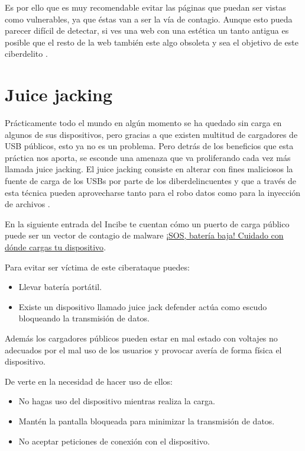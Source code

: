 \documentclass[
  a4paper,
  openany]{book}
\begin{document}
Es por ello que es muy recomendable evitar las páginas que puedan ser vistas como vulnerables, ya que éstas van a ser la vía de contagio. Aunque esto pueda parecer difícil de detectar, si ves una web con una estética un tanto antigua es posible que el resto de la web también este algo obsoleta y sea el objetivo de este ciberdelito \citep{RZ-formjacking}.

\hypertarget{juice-jacking}{%
\section{Juice jacking}\label{juice-jacking}}

Prácticamente todo el mundo en algún momento se ha quedado sin carga en algunos de sus dispositivos, pero gracias a que existen multitud de cargadores de USB públicos, esto ya no es un problema. Pero detrás de los beneficios que esta práctica nos aporta, se esconde una amenaza que va proliferando cada vez más llamada juice jacking. El juice jacking consiste en alterar con fines maliciosos la fuente de carga de los USBs por parte de los diberdelincuentes y que a través de esta técnica pueden aprovecharse tanto para el robo datos como para la inyección de archivos \citep{ESET-juice-jacking}.

En la siguiente entrada del Incibe te cuentan cómo un puerto de carga público puede ser un vector de contagio de malware \href{https://www.incibe.es/empresas/blog/sos-bateria-baja-cuidado-con-donde-cargas-tu-dispositivo}{¡SOS, batería baja! Cuidado con dónde cargas tu dispositivo}.

Para evitar ser víctima de este ciberataque puedes:

\begin{itemize}
\item
  Llevar batería portátil.
\item
  Existe un dispositivo llamado juice jack defender actúa como escudo bloqueando la transmisión de datos.
\end{itemize}

Además los cargadores públicos pueden estar en mal estado con voltajes no adecuados por el mal uso de los usuarios y provocar avería de forma física el dispositivo.

De verte en la necesidad de hacer uso de ellos:

\begin{itemize}
\item
  No hagas uso del dispositivo mientras realiza la carga.
\item
  Mantén la pantalla bloqueada para minimizar la transmisión de datos.
\item
  No aceptar peticiones de conexión con el dispositivo.
\end{itemize}
\end{document}
